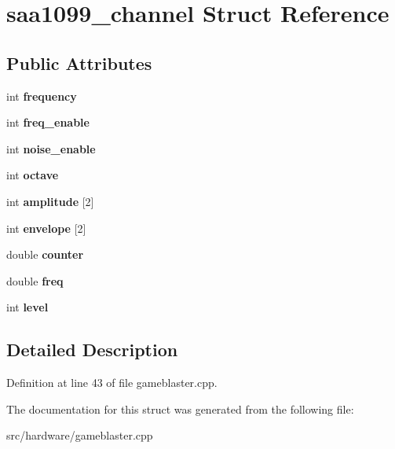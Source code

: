 \hypertarget{structsaa1099__channel}{\section{saa1099\-\_\-channel Struct Reference}
\label{structsaa1099__channel}
}
\subsection*{Public Attributes}
\begin{DoxyCompactItemize}
\item 
\hypertarget{structsaa1099__channel_a3cd55c46a5f18fa8af6c0372217be9de}{int {\bfseries frequency}}\label{structsaa1099__channel_a3cd55c46a5f18fa8af6c0372217be9de}

\item 
\hypertarget{structsaa1099__channel_a099157673787fdf001b8b1feef8aaff4}{int {\bfseries freq\-\_\-enable}}\label{structsaa1099__channel_a099157673787fdf001b8b1feef8aaff4}

\item 
\hypertarget{structsaa1099__channel_a30a80209bf577b914c5104087fc854cb}{int {\bfseries noise\-\_\-enable}}\label{structsaa1099__channel_a30a80209bf577b914c5104087fc854cb}

\item 
\hypertarget{structsaa1099__channel_a0828ed63966e1a2dcfcbc3439095dc0a}{int {\bfseries octave}}\label{structsaa1099__channel_a0828ed63966e1a2dcfcbc3439095dc0a}

\item 
\hypertarget{structsaa1099__channel_aa2614ae19e495ab5367e8b0f7ca79c20}{int {\bfseries amplitude} \mbox{[}2\mbox{]}}\label{structsaa1099__channel_aa2614ae19e495ab5367e8b0f7ca79c20}

\item 
\hypertarget{structsaa1099__channel_a325044775486d3b669e0736ba7a70b83}{int {\bfseries envelope} \mbox{[}2\mbox{]}}\label{structsaa1099__channel_a325044775486d3b669e0736ba7a70b83}

\item 
\hypertarget{structsaa1099__channel_adef8f5f3960d1a186d682964f9871a82}{double {\bfseries counter}}\label{structsaa1099__channel_adef8f5f3960d1a186d682964f9871a82}

\item 
\hypertarget{structsaa1099__channel_a1b2d8afa816915b573add94f96acc45c}{double {\bfseries freq}}\label{structsaa1099__channel_a1b2d8afa816915b573add94f96acc45c}

\item 
\hypertarget{structsaa1099__channel_a5aeb1053ccb97334e9b52c122c553e11}{int {\bfseries level}}\label{structsaa1099__channel_a5aeb1053ccb97334e9b52c122c553e11}

\end{DoxyCompactItemize}


\subsection{Detailed Description}


Definition at line 43 of file gameblaster.\-cpp.



The documentation for this struct was generated from the following file\-:\begin{DoxyCompactItemize}
\item 
src/hardware/gameblaster.\-cpp\end{DoxyCompactItemize}
